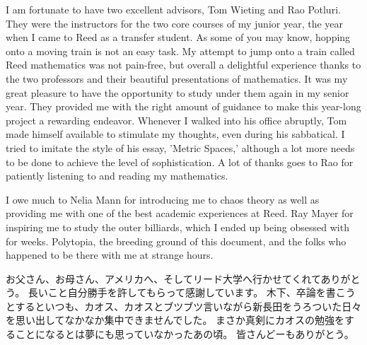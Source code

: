 I am fortunate to have two excellent advisors, Tom Wieting and Rao Potluri.
They were the instructors for the two core courses of my junior year, the year when I came to Reed as a transfer student.
As some of you may know, hopping onto a moving train is not an easy task.
My attempt to jump onto a train called Reed mathematics was not pain-free, but overall a delightful experience thanks to the two professors and their beautiful presentations of mathematics.
It was my great pleasure to have the opportunity to study under them again in my senior year.
They provided me with the right amount of guidance to make this year-long project a rewarding endeavor.
Whenever I walked into his office abruptly, Tom made himself available to stimulate my thoughts, even during his sabbatical.
I tried to imitate the style of his essay, 'Metric Spaces,' although a lot more needs to be done to achieve the level of sophistication.
A lot of thanks goes to Rao for patiently listening to and reading my mathematics.

I owe much to Nelia Mann for introducing me to chaos theory as well as providing me with one of the best academic experiences at Reed.
Ray Mayer for inspiring me to study the outer billiards, which I ended up being obsessed with for weeks.
Polytopia, the breeding ground of this document, and the folks who happened to be there with me at strange hours.

お父さん、お母さん、アメリカへ、そしてリード大学へ行かせてくれてありがとう。
長いこと自分勝手を許してもらって感謝しています。
木下、卒論を書こうとするといつも、カオス、カオスとブツブツ言いながら新長田をうろついた日々を思い出してなかなか集中できませんでした。
まさか真剣にカオスの勉強をすることになるとは夢にも思っていなかったあの頃。
皆さんどーもありがとう。
